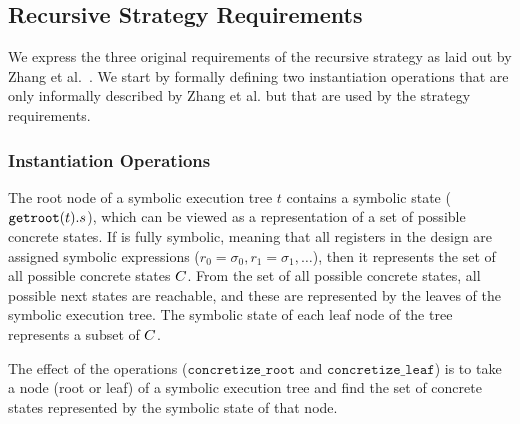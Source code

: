 \subsection{Recursive Strategy Requirements}
We express the three original requirements of the recursive strategy as
laid out by Zhang et al.~\cite{zhang2018recursive}. 
We start by formally defining two instantiation operations that are only informally described
by Zhang et al. but that are used by the strategy requirements.

\subsubsection{Instantiation Operations} 

The root node of a symbolic execution tree $t$ contains a symbolic state
  ($\mathtt{getroot}(t).s$), which can be viewed as a representation of
  a set of possible concrete states. If \symstate{} is fully symbolic, meaning
  that all registers in the design are assigned symbolic expressions ($r_0 =
  \sigma_0, r_1 = \sigma_1, \ldots$), then it represents the set of all
  possible concrete states $C$. From the set of all possible concrete
  states, all possible next states are reachable, and these are represented by
  the leaves of the symbolic execution tree. The symbolic state of each leaf node of the tree
  represents a subset of $C$.

  The effect of the
operations ($\mathtt{concretize\_root}$ and $\mathtt{concretize\_leaf}$) is to take a node (root or leaf) of a symbolic execution tree and
find the set of concrete states represented by the symbolic state of that
node. 



